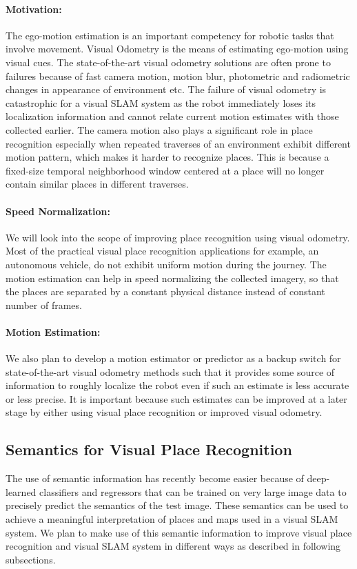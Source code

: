 \documentclass{article}
\begin{document}
\paragraph{Motivation:}The ego-motion estimation is an important competency for robotic tasks that involve movement. Visual Odometry is the means of estimating ego-motion using visual cues. The state-of-the-art visual odometry solutions are often prone to failures because of fast camera motion, motion blur, photometric and radiometric changes in appearance of environment etc. The failure of visual odometry is catastrophic for a visual SLAM system as the robot immediately loses its localization information and cannot relate current motion estimates with those collected earlier. The camera motion also plays a significant role in place recognition especially when repeated traverses of an environment exhibit different motion pattern, which makes it harder to recognize places. This is because a fixed-size temporal neighborhood window centered at a place will no longer contain similar places in different traverses.

\paragraph{Speed Normalization:}We will look into the scope of improving place recognition using visual odometry. Most of the practical visual place recognition applications for example, an autonomous vehicle, do not exhibit uniform motion during the journey. The motion estimation can help in speed normalizing the collected imagery, so that the places are separated by a constant physical distance instead of constant number of frames.

\paragraph{Motion Estimation:}We also plan to develop a motion estimator or predictor as a backup switch for state-of-the-art visual odometry methods such that it provides some source of information to roughly localize the robot even if such an estimate is less accurate or less precise. It is important because such estimates can be improved at a later stage by either using visual place recognition or improved visual odometry.


\subsection{Semantics for Visual Place Recognition}
The use of semantic information has recently become easier because of deep-learned classifiers and regressors \cite{girshick2014rich,zhou2014learning} that can be trained on very large image data to precisely predict the semantics of the test image. These semantics can be used to achieve a meaningful interpretation of places and maps used in a visual SLAM system. We plan to make use of this semantic information to improve visual place recognition and visual SLAM system in different ways as described in following subsections.
\end{document}
